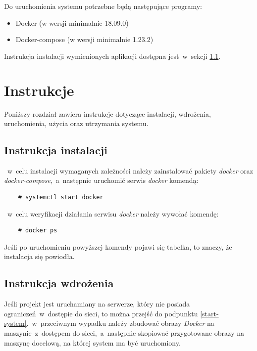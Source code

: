 \documentclass[a4paper,11pt,twoside]{report}
\theoremstyle{definition}
\begin{document}
        Do uruchomienia systemu potrzebne będą następujące programy:
        
        \begin{itemize}
            \item Docker (w wersji minimalnie 18.09.0)
            \item Docker-compose (w wersji minimalnie 1.23.2)
        \end{itemize}
    
        Instrukcja instalacji wymienionych aplikacji dostępna jest~w~sekcji \ref{installation-instruction}.
    
    \section{Instrukcje}
        Poniższy rozdział zawiera instrukcje dotyczące instalacji, wdrożenia, uruchomienia, użycia oraz utrzymania systemu.
    
    \subsection{Instrukcja instalacji}
        \label{installation-instruction}
       ~w~celu instalacji wymaganych zależności należy zainstalować pakiety \textit{docker} oraz \textit{docker-compose},~a~następnie uruchomić serwis \textit{docker} komendą:

        \begin{verbatim}
    # systemctl start docker
        \end{verbatim}

       ~w~celu weryfikacji działania serwisu \textit{docker} należy wywołać komendę:
        \begin{verbatim}
    # docker ps
        \end{verbatim}

        Jeśli po uruchomieniu powyższej komendy pojawi się tabelka, to znaczy, że instalacja się powiodła.

    \subsection{Instrukcja wdrożenia}
    
        Jeśli projekt jest uruchamiany na serwerze, który nie posiada ograniczeń~w~dostępie do sieci, to można przejść do podpunktu \ref{start-system}.~w~przeciwnym wypadku należy zbudować obrazy \textit{Docker} na maszynie~z~dostępem do sieci,~a~następnie skopiować przygotowane obrazy na maszynę docelową, na której system ma być uruchomiony.
        
\end{document}
